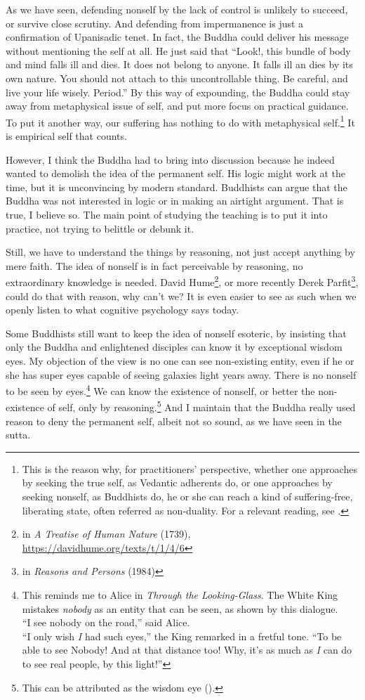 As we have seen, defending nonself by the lack of control is unlikely to succeed, or survive close scrutiny. And defending from impermanence is just a confirmation of Upanisadic tenet. In fact, the Buddha could deliver his message without mentioning the self at all. He just said that ``Look!, this bundle of body and mind falls ill and dies. It does not belong to anyone. It falls ill an dies by its own nature. You should not attach to this uncontrollable thing. Be careful, and live your life wisely. Period.'' By this way of expounding, the Buddha could stay away from metaphysical issue of self, and put more focus on practical guidance. To put it another way, our suffering has nothing to do with metaphysical self.\footnote{This is the reason why, for practitioners' perspective, whether one approaches by seeking the true self, as Vedantic adherents do, or one approaches by seeking nonself, as Buddhists do, he or she can reach a kind of suffering-free, liberating state, often referred as non-duality. For a relevant reading, see \citealp{davis:advaita}.} It is empirical self that counts.

However, I think the Buddha had to bring  into discussion because he indeed wanted to demolish the idea of the permanent self. His logic might work at the time, but it is unconvincing by modern standard. Buddhists can argue that the Buddha was not interested in logic or in making an airtight argument. That is true, I believe so. The main point of studying the teaching is to put it into practice, not trying to belittle or debunk it. 

Still, we have to understand the things by reasoning, not just accept anything by mere faith. The idea of nonself is in fact perceivable by reasoning, no extraordinary knowledge is needed. David Hume\footnote{in \emph{A Treatise of Human Nature} (1739), \url{https://davidhume.org/texts/t/1/4/6}}, or more recently Derek Parfit\footnote{in \emph{Reasons and Persons} (1984)}, could do that with reason, why can't we? It is even easier to see as such when we openly listen to what cognitive psychology says today.

Some Buddhists still want to keep the idea of nonself esoteric, by insisting that only the Buddha and enlightened disciples can know it by exceptional wisdom eyes. My objection of the view is no one can see non-existing entity, even if he or she has super eyes capable of seeing galaxies light years away. There is no nonself to be seen by eyes.\footnote{This reminds me to Alice in \emph{Through the Looking-Glass}. The White King mistakes \emph{nobody} as an entity that can be seen, as shown by this dialogue.\\[1mm]``I see nobody on the road,'' said Alice.\\``I only wish \textit{I} had such eyes,'' the King remarked in a fretful tone. ``To be able to see Nobody! And at that distance too! Why, it's as much as \textit{I} can do to see real people, by this light!''} We can know the existence of nonself, or better the non-existence of self, only by reasoning.\footnote{This can be attributed as the wisdom eye ().} And I maintain that the Buddha really used reason to deny the permanent self, albeit not so sound, as we have seen in the sutta.
